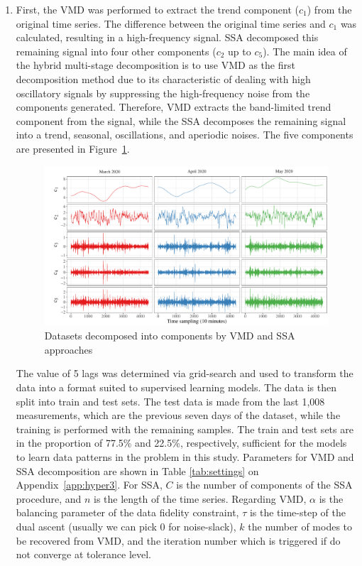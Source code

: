 \begin{enumerate}[start=1,label={\textbf{Step \arabic*:}},wide = 0pt, leftmargin = 3em]
\item First, the \ac{VMD} was performed to extract the trend component ($c_1$) from the original time series. The difference between the original time series and $c_1$ was calculated, resulting in a high-frequency signal. \ac{SSA} decomposed this remaining signal into four other components ($c_2$ up to $c_5$). The main idea of the hybrid multi-stage decomposition is to use \ac{VMD} as the first decomposition method due to its characteristic of dealing with high oscillatory signals by suppressing the high-frequency noise from the components generated. Therefore, \ac{VMD} extracts the band-limited trend component from the signal, while the \ac{SSA} decomposes the remaining signal into a trend, seasonal, oscillations, and aperiodic noises. The five components are presented in Figure~\ref{fig:comps}.

\begin{figure}[htb!]
    \centering
    \includegraphics[width=\linewidth]{Media/cs3_imf_plot.pdf}
    \caption{Datasets decomposed into components by VMD and SSA approaches}
    \label{fig:comps}
\end{figure}

The value of 5 lags was determined via grid-search and used to transform the data into a format suited to supervised learning models. The data is then split into train and test sets. The test data is made from the last 1,008 measurements, which are the previous seven days of the dataset, while the training is performed with the remaining samples. The train and test sets are in the proportion of 77.5\% and 22.5\%, respectively, sufficient for the models to learn data patterns in the problem in this study. Parameters for \ac{VMD} and \ac{SSA} decomposition are shown in Table \ref{tab:settings} on Appendix~\ref{app:hyper3}. For \ac{SSA}, $C$ is the number of components of the \ac{SSA} procedure, and $n$ is the length of the time series. Regarding \ac{VMD}, $\alpha$ is the balancing parameter of the data fidelity constraint, $\tau$ is the time-step of the dual ascent (usually we can pick 0 for noise-slack), $k$ the number of modes to be recovered from \ac{VMD}, and the iteration number which is triggered if do not converge at tolerance level.


\end{enumerate}
